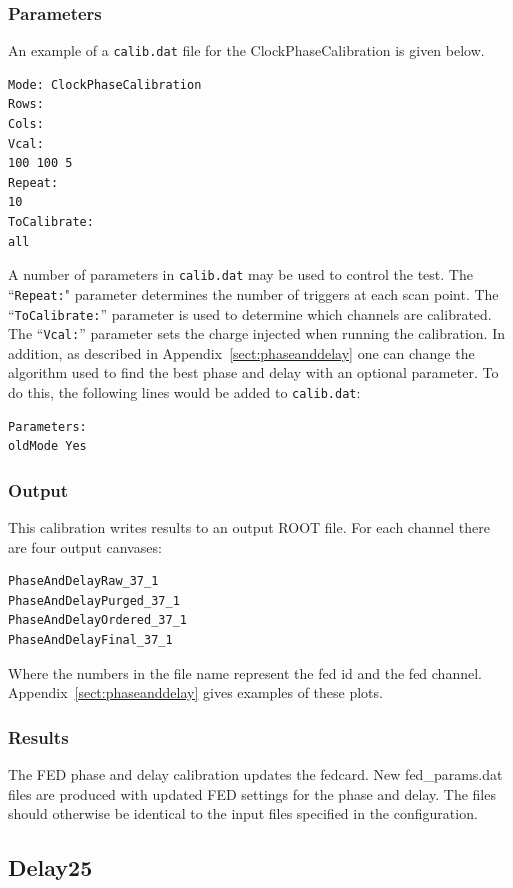 \subsubsection{Parameters}

An example of a \verb|calib.dat| file for the ClockPhaseCalibration is given below.

\begin{verbatim}
Mode: ClockPhaseCalibration
Rows:
Cols:
Vcal:
100 100 5
Repeat:
10
ToCalibrate:
all
\end{verbatim}

A number of parameters in \verb|calib.dat| may be used to control the test. The ``\verb|Repeat:|" parameter determines the number of triggers at each scan point.  The ``\verb|ToCalibrate:|'' parameter is used to determine which channels are calibrated.  The ``\verb|Vcal:|'' parameter sets the charge injected when running the calibration. In addition, as described in Appendix~\ref{sect:phaseanddelay} one can change the algorithm used to find the best phase and delay with an optional parameter.  To do this, the following lines would be added to \verb|calib.dat|:

\begin{verbatim}
Parameters:
oldMode Yes
\end{verbatim}

\subsubsection{Output}
This calibration writes results to an output ROOT file. For each channel there are four output canvases:
\begin{verbatim}
PhaseAndDelayRaw_37_1
PhaseAndDelayPurged_37_1
PhaseAndDelayOrdered_37_1
PhaseAndDelayFinal_37_1
\end{verbatim}
Where the numbers in the file name represent the fed id and the fed channel. Appendix~\ref{sect:phaseanddelay} gives examples of these plots.

\subsubsection{Results}
The FED phase and delay calibration updates the fedcard.  New fed\_params.dat files are produced with updated FED settings for the phase and delay. The files should otherwise be identical to the input files specified in the configuration.

\subsection{Delay25}
\label{sec:Delay25Calibration}

